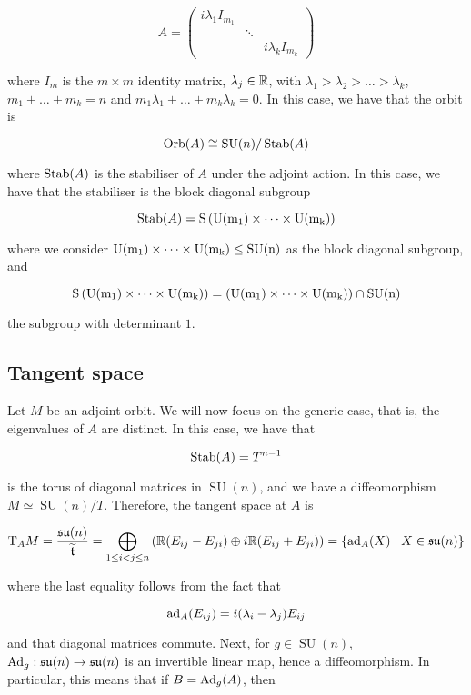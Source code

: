 \documentclass{article}
\DeclareMathOperator{\SU}{SU}
\newcommand{\su}{\mathfrak{su}}
\renewcommand{\tilde}{\widetilde}
\begin{document}
\[A = \begin{pmatrix}
    i\lambda_1 I_{m_1} \\
    & \ddots \\
    & & i\lambda_k I_{m_k}
\end{pmatrix}\]

where \(I_m\) is the \(m \times m\) identity matrix, \(\lambda_j \in \mathbb{R}\), with \(\lambda_1 > \lambda_2 > \dots > \lambda_k\), \(m_1 + \dots + m_k = n\) and \(m_1\lambda_1 + \dots + m_k\lambda_k = 0\). In this case, we have that the orbit is

\[\Orb(A) \cong \SU(n)/\Stab(A)\]

where \(\operatorname{Stab}(A)\) is the stabiliser of \(A\) under the adjoint action. In this case, we have that the stabiliser is the block diagonal subgroup

\[\operatorname{Stab}(A) = \rm S\left(\rm U(m_1) \times \dots \times \rm U(m_k)\right)\]

where we consider \(\rm U(m_1) \times \cdots \times \rm U(m_k) \le \SU(n)\) as the block diagonal subgroup, and

\[\rm S\left(\rm U(m_1) \times \dots \times \rm U(m_k)\right) = \left(\rm U(m_1) \times \cdots \times \rm U(m_k)\right) \cap \SU(n)\]

the subgroup with determinant \(1\).

\subsection{Tangent space}

Let \(M\) be an adjoint orbit. We will now focus on the generic case, that is, the eigenvalues of \(A\) are distinct. In this case, we have that

\[\operatorname{Stab}(A) = T^{n-1}\]

is the torus of diagonal matrices in \(\SU(n)\), and we have a diffeomorphism \(M \simeq \SU(n)/T\). Therefore, the tangent space at \(A\) is

\[\TT_AM = \frac{\su(n)}{\tilde \mft} = \bigoplus_{1 \le i < j \le n} \left(\R(E_{ij} - E_{ji}) \oplus i\R (E_{ij} + E_{ji})\right) = \{\ad_A(X) \mid X \in \su(n)\}\]

where the last equality follows from the fact that

\[\operatorname{ad}_A(E_{ij}) = i(\lambda_i - \lambda_j)E_{ij}\]

and that diagonal matrices commute. Next, for \(g \in \SU(n)\), \(\Ad_g : \su(n) \to \su(n)\) is an invertible linear map, hence a diffeomorphism. In particular, this means that if \(B = \operatorname{Ad}_g(A)\), then
\end{document}
